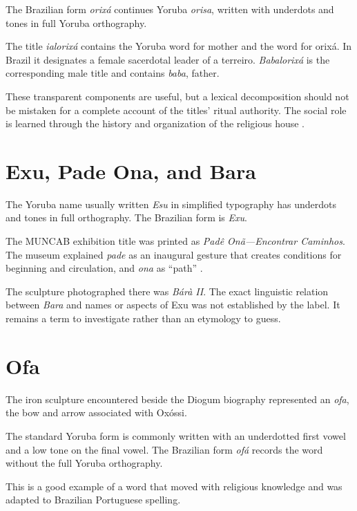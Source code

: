 The Brazilian form \emph{orix\'a}
continues Yoruba \emph{orisa}, written
with underdots and tones in full Yoruba
orthography.

The title \emph{ialorix\'a} contains the
Yoruba word for mother and the word for
orix\'a. In Brazil it designates a female
sacerdotal leader of a terreiro.
\emph{Babalorix\'a} is the corresponding
male title and contains \emph{baba},
father.

These transparent components are useful,
but a lexical decomposition should not be
mistaken for a complete account of the
titles' ritual authority. The social role
is learned through the history and
organization of the religious house
\cite{barata2025ancestralidade}.

\section{Exu, Pade Ona, and Bara}
\label{section-languages-exu-pade}

The Yoruba name usually written
\emph{Esu} in simplified typography has
underdots and tones in full orthography.
The Brazilian form is \emph{Exu}.

The MUNCAB exhibition title was printed as
\emph{Pad\^e On\~a---Encontrar
Caminhos}. The museum explained
\emph{pade} as an inaugural gesture that
creates conditions for beginning and
circulation, and \emph{ona} as ``path''
\cite{muncab2026padeona}.

The sculpture photographed there was
\emph{B\'ar\`a II}. The exact linguistic
relation between \emph{Bara} and names or
aspects of Exu was not established by the
label. It remains a term to investigate
rather than an etymology to guess.

\section{Ofa}
\label{section-languages-ofa}

The iron sculpture encountered beside the
Diogum biography represented an
\emph{ofa}, the bow and arrow associated
with Ox\'ossi.

The standard Yoruba form is commonly
written with an underdotted first vowel and
a low tone on the final vowel.  The
Brazilian form \emph{of\'a} records the word
without the full Yoruba orthography.

This is a good example of a word that moved
with religious knowledge and was adapted
to Brazilian Portuguese spelling.

